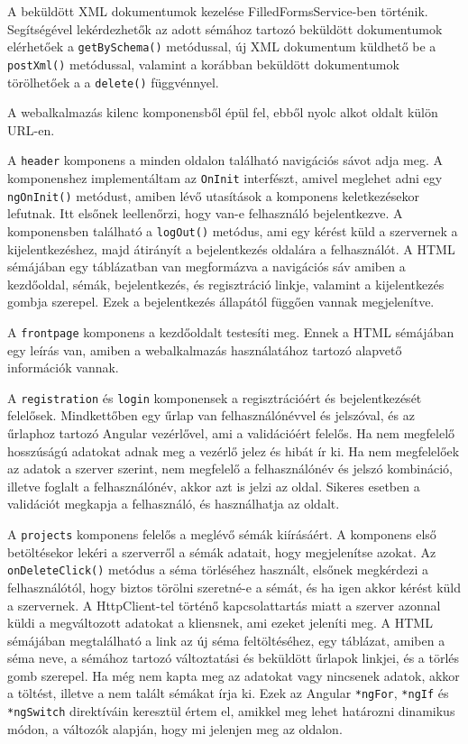 A beküldött XML dokumentumok kezelése  FilledFormsService-ben történik. Segítségével lekérdezhetők az adott sémához tartozó beküldött dokumentumok elérhetőek a \texttt{getBySchema()} metódussal, új XML dokumentum küldhető be a \texttt{postXml()} metódussal, valamint a korábban beküldött dokumentumok törölhetőek a a \texttt{delete()} függvénnyel.


A webalkalmazás kilenc komponensből épül fel, ebből nyolc alkot oldalt külön URL-en.

A \texttt{header} komponens a minden oldalon található navigációs sávot adja meg. A komponenshez implementáltam az \texttt{OnInit} interfészt, amivel meglehet adni egy \texttt{ngOnInit()} metódust, amiben lévő utasítások a komponens keletkezésekor lefutnak. Itt elsőnek leellenőrzi, hogy van-e felhasználó bejelentkezve. A komponensben található a \texttt{logOut()} metódus, ami egy kérést küld a szervernek a kijelentkezéshez, majd átirányít a bejelentkezés oldalára a felhasználót. A HTML sémájában egy táblázatban van megformázva a navigációs sáv amiben a kezdőoldal, sémák, bejelentkezés, és regisztráció linkje, valamint a kijelentkezés gombja szerepel. Ezek a bejelentkezés állapától függően vannak megjelenítve.

A \texttt{frontpage} komponens a kezdőoldalt testesíti meg. Ennek a HTML sémájában egy leírás van, amiben a webalkalmazás használatához tartozó alapvető információk vannak.

A \texttt{registration} és \texttt{login} komponensek a regisztrációért és bejelentkezését felelősek. Mindkettőben egy űrlap van felhasználónévvel és jelszóval, és az űrlaphoz tartozó Angular vezérlővel, ami a validációért felelős. Ha nem megfelelő hosszúságú adatokat adnak meg a vezérlő jelez és hibát ír ki. Ha nem megfelelőek az adatok a szerver szerint, nem megfelelő a felhasználónév és jelszó kombináció, illetve foglalt a felhasználónév, akkor azt is jelzi az oldal. Sikeres esetben a validációt megkapja a felhasználó, és használhatja az oldalt.

A \texttt{projects} komponens felelős a meglévő sémák kiírásáért. A komponens első betöltésekor lekéri a szerverről a sémák adatait, hogy megjelenítse azokat. Az \\ \texttt{onDeleteClick()} metódus a séma törléséhez használt, elsőnek megkérdezi a felhasználótól, hogy biztos törölni szeretné-e a sémát, és ha igen akkor kérést küld a szervernek. A HttpClient-tel történő kapcsolattartás miatt a szerver azonnal küldi a megváltozott adatokat a kliensnek, ami ezeket jeleníti meg. A HTML sémájában megtalálható a link az új séma feltöltéséhez, egy táblázat, amiben a séma neve, a sémához tartozó változtatási és beküldött űrlapok linkjei, és a törlés gomb szerepel. Ha még nem kapta meg az adatokat vagy nincsenek adatok, akkor a töltést, illetve a nem talált sémákat írja ki. Ezek az Angular \texttt{*ngFor}, \texttt{*ngIf} és \texttt{*ngSwitch} direktíváin keresztül értem el, amikkel meg lehet határozni dinamikus módon, a változók alapján, hogy mi jelenjen meg az oldalon.

